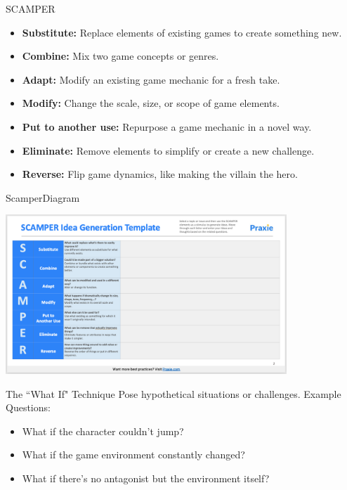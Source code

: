 \documentclass[10pt]{beamer}
\begin{document}


\begin{frame}{SCAMPER}
\begin{itemize}
\item \textbf{Substitute:} Replace elements of existing games to create something new.
\item \textbf{Combine:} Mix two game concepts or genres.
\item \textbf{Adapt:} Modify an existing game mechanic for a fresh take.
\item \textbf{Modify:} Change the scale, size, or scope of game elements.
\item \textbf{Put to another use:} Repurpose a game mechanic in a novel way.
\item \textbf{Eliminate:} Remove elements to simplify or create a new challenge.
\item \textbf{Reverse:} Flip game dynamics, like making the villain the hero.
\end{itemize}
\end{frame}


\begin{frame}{Scamper}{Diagram}
\begin{center}
\includegraphics[height=6cm]{images/scamper}
\end{center}
\end{frame}


\begin{frame}{The ``What If" Technique}
Pose hypothetical situations or challenges.
Example Questions:
\begin{itemize}
\item What if the character couldn't jump?
\item What if the game environment constantly changed?
\item What if there's no antagonist but the environment itself?
\end{itemize}
\end{frame}
\end{document}

